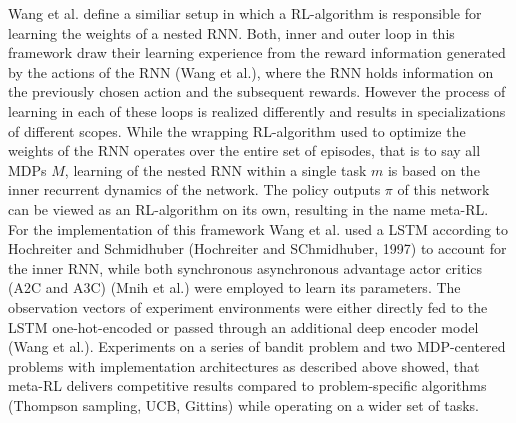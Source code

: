 \documentclass[letterpaper, 10 pt, conference]{ieeeconf}  %
\begin{document}
Wang et al. define a similiar setup in which a RL-algorithm is responsible for learning the weights of a nested RNN. Both, inner and outer loop 
in this framework draw their learning experience from the reward information generated by the actions of the RNN (Wang et al.), where 
the RNN holds information on the previously chosen action and the subsequent rewards. However the process of learning
in each of these loops is realized differently and results in specializations of different scopes. While the wrapping RL-algorithm used to 
optimize the weights of the RNN operates over the entire set of episodes, that is to say all MDPs $M$, learning of the nested RNN 
within a single task $m$ is based on the inner recurrent dynamics of the network. The policy outputs $\pi$ of this network can 
be viewed as an RL-algorithm on its own, resulting in the name meta-RL. For the implementation of this framework Wang et al. 
used a LSTM according to Hochreiter and Schmidhuber (Hochreiter and SChmidhuber, 1997) to account for the inner RNN, while both synchronous 
asynchronous advantage actor critics (A2C and A3C) (Mnih et al.) were employed to learn its parameters. The observation vectors of experiment environments
were either directly fed to the LSTM one-hot-encoded or passed through an additional deep encoder model (Wang et al.). 
Experiments on a series of bandit problem and two
MDP-centered problems with implementation architectures as described above showed, that meta-RL delivers 
competitive results compared to problem-specific algorithms (Thompson sampling, UCB, Gittins) while operating on a 
wider set of tasks. \newline
\end{document}

